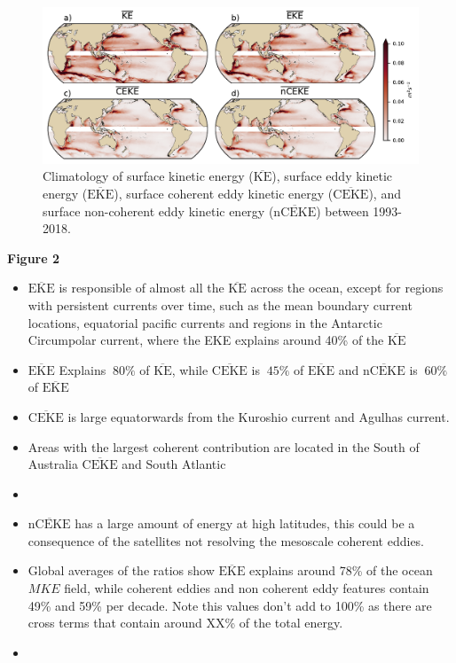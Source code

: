 \documentclass[draft,linenumbers]{agujournal2019}
\newcommand{\MKE}{\overline{\textrm{KE}}}
\newcommand{\MEKE}{\overline{\textrm{EKE}}}
\newcommand{\MCEKE}{\overline{\textrm{CEKE}}}
\newcommand{\MnCEKE}{\overline{\textrm{nCEKE}}}
\begin{document}
	\begin{figure}
	    \centering
	    \includegraphics[width=1\textwidth]{figures/mean_ke_maps_satellite.pdf}
	    \caption{Climatology of surface kinetic energy ($\MKE$), surface eddy kinetic energy ($\MEKE$), surface coherent eddy kinetic energy ($\MCEKE$), and surface non-coherent eddy kinetic energy ($\MnCEKE$) between 1993-2018.}
	    \label{fig:eddy_climatology}
	\end{figure}


	\textbf{Figure 2}
	\begin{itemize}
		\item $\MEKE$ is responsible of almost all the $\MKE$ across the ocean, except for regions with persistent currents over time, such as the mean boundary current locations, equatorial pacific currents and regions in the Antarctic Circumpolar current, where the EKE explains around 40\% of the $\MKE$
		\item $\MEKE$ Explains $~80\%$ of $\MKE$, while $\MCEKE$ is $~45\%$ of $\MEKE$ and $\MnCEKE$  is $~60\%$ of $\MEKE$ 
		\item $\MCEKE$ is large equatorwards from the Kuroshio current and Agulhas current.
		\item Areas with the largest coherent contribution are located in the South of Australia $\MCEKE$ and South Atlantic
		\item 
		\item $\MnCEKE$ has a large amount of energy at high latitudes, this could be a consequence of the satellites not resolving the mesoscale coherent eddies. 
		\item Global averages of the ratios show $\MEKE$ explains around 78\% of the ocean $MKE$ field, while coherent eddies and non coherent eddy features contain 49\% and 59\% per decade. Note this values don't add to 100\% as there are cross terms that contain around XX\% of the total energy.
		\item  
	\end{itemize}
\end{document}
